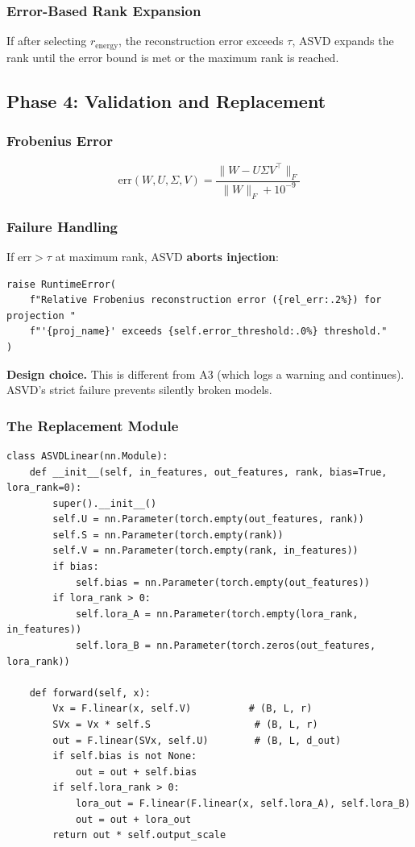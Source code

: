 \subsubsection{Error-Based Rank Expansion}

If after selecting $r_\text{energy}$, the reconstruction error exceeds 
$\tau$, ASVD expands the rank until the error bound is met or the maximum 
rank is reached.

\subsection{Phase 4: Validation and Replacement}

\subsubsection{Frobenius Error}

\[
\text{err}(W, U, \Sigma, V) = \frac{\|W - U \Sigma V^\top\|_F}{\|W\|_F + 10^{-9}}
\]

\subsubsection{Failure Handling}

If $\text{err} > \tau$ at maximum rank, ASVD \textbf{aborts injection}:

\begin{lstlisting}
raise RuntimeError(
    f"Relative Frobenius reconstruction error ({rel_err:.2%}) for projection "
    f"'{proj_name}' exceeds {self.error_threshold:.0%} threshold."
)
\end{lstlisting}

\textbf{Design choice.} This is different from A3 (which logs a warning and 
continues). ASVD's strict failure prevents silently broken models.

\subsubsection{The Replacement Module}

\begin{lstlisting}
class ASVDLinear(nn.Module):
    def __init__(self, in_features, out_features, rank, bias=True, lora_rank=0):
        super().__init__()
        self.U = nn.Parameter(torch.empty(out_features, rank))
        self.S = nn.Parameter(torch.empty(rank))
        self.V = nn.Parameter(torch.empty(rank, in_features))
        if bias:
            self.bias = nn.Parameter(torch.empty(out_features))
        if lora_rank > 0:
            self.lora_A = nn.Parameter(torch.empty(lora_rank, in_features))
            self.lora_B = nn.Parameter(torch.zeros(out_features, lora_rank))
    
    def forward(self, x):
        Vx = F.linear(x, self.V)          # (B, L, r)
        SVx = Vx * self.S                  # (B, L, r)
        out = F.linear(SVx, self.U)        # (B, L, d_out)
        if self.bias is not None:
            out = out + self.bias
        if self.lora_rank > 0:
            lora_out = F.linear(F.linear(x, self.lora_A), self.lora_B)
            out = out + lora_out
        return out * self.output_scale
\end{lstlisting}

